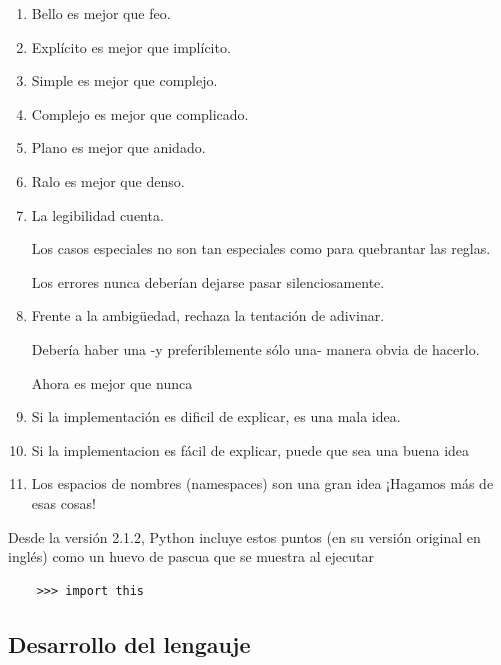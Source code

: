 \documentclass[a4paper]{report}
\begin{document}
\begin{enumerate}
  \item Bello es mejor que feo.
  \item Explícito es mejor que implícito.
  \item Simple es mejor que complejo.
  \item Complejo es mejor que complicado.
  \item Plano es mejor que anidado.
  \item Ralo es mejor que denso.
  \item La legibilidad cuenta.
  \begin{item}
    Los casos especiales no son tan especiales como para quebrantar las reglas.
  \end{item}
  \begin{item}
    Los errores nunca deberían dejarse pasar silenciosamente.
  \end{item}
  \item {Frente a la ambigüedad, rechaza la tentación de adivinar.}
  \begin{item}
    Debería haber una -y preferiblemente sólo una- manera obvia de hacerlo. 
  \end{item}
  \begin{item}
    Ahora es mejor que nunca
  \end{item}
  \item {Si la implementación es dificil de explicar, es una mala idea.}
  \item {Si la implementacion es fácil de explicar, puede que sea una buena idea}
  \item {Los espacios de nombres (namespaces) son una gran idea ¡Hagamos más de esas cosas!}
  \end{enumerate}
  Desde la versión 2.1.2, Python incluye estos puntos (en su versión original en inglés) 
  como un huevo de pascua que se muestra al ejecutar 
  \begin{verbatim}
    >>> import this
  \end{verbatim}

\subsection{Desarrollo del lengauje}
\end{document}
